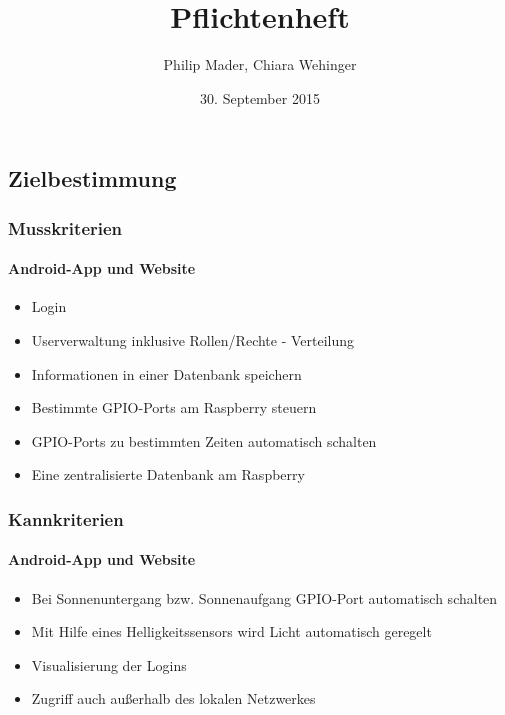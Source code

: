 \documentclass[10pt,a4paper]{report}
\author{Philip Mader, Chiara Wehinger}
\title{Pflichtenheft}
\date{30. September 2015}
\begin{document}
\maketitle
\tableofcontents
\newpage

\chapter{}

\section{Zielbestimmung}

\subsection{Musskriterien}
\subsubsection{Android-App und Website}
\begin{itemize}
\item Login
\item Userverwaltung inklusive Rollen/Rechte - Verteilung
\item Informationen in einer Datenbank speichern
\item Bestimmte GPIO-Ports am Raspberry steuern
\item GPIO-Ports zu bestimmten Zeiten automatisch schalten
\item Eine zentralisierte Datenbank am Raspberry
\end{itemize}


\subsection{Kannkriterien}
\subsubsection{Android-App und Website}
\begin{itemize}
\item Bei Sonnenuntergang bzw. Sonnenaufgang GPIO-Port automatisch schalten
\item Mit Hilfe eines Helligkeitssensors wird Licht automatisch geregelt
\item Visualisierung der Logins 
\item Zugriff auch außerhalb des lokalen Netzwerkes
\end{itemize}
\end{document}
